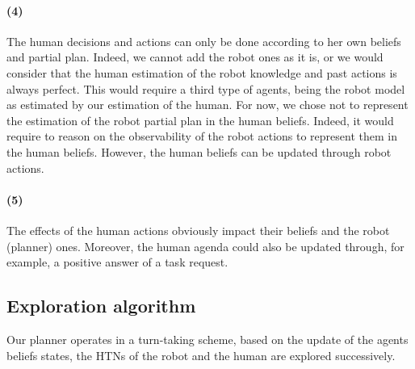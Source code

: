\documentclass[a4paper,11pt,twoside]{StyleThese}
\begin{document}
\paragraph{(4)} The human decisions and actions can only be done according to her own beliefs and partial plan. Indeed, we cannot add the robot ones as it is, or we would consider that the human estimation of the robot knowledge and past actions is always perfect. This would require a third type of agents, being the robot model as estimated by our estimation of the human. For now, we chose not to represent the estimation of the robot partial plan in the human beliefs. Indeed, it would require to reason on the observability of the robot actions to represent them in the human beliefs. However, the human beliefs can be updated through robot actions.

\paragraph{(5)}The effects of the human actions obviously impact their beliefs and the robot (planner) ones. Moreover, the human agenda could also be updated through, for example, a positive answer of a task request.


\subsection{Exploration algorithm}
Our planner operates in a turn-taking scheme, based on the update of the agents beliefs states, the HTNs of the robot and the human are explored successively.
\end{document}
